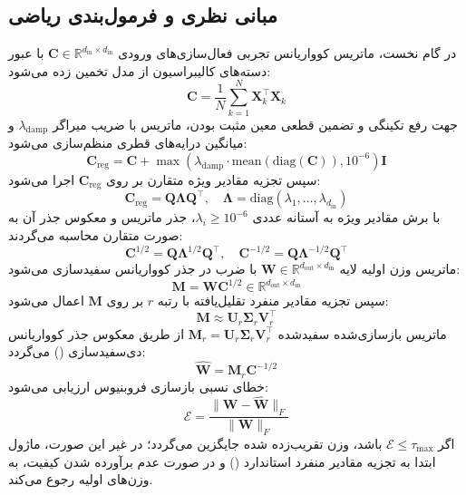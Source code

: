 \subsection{مبانی نظری و فرمول‌بندی ریاضی}
در گام نخست، ماتریس کوواریانس تجربی فعال‌سازی‌های ورودی $\mathbf{C} \in \mathbb{R}^{d_{\text{in}} \times d_{\text{in}}}$ با عبور دسته‌های کالیبراسیون از مدل تخمین زده می‌شود:
\begin{equation}
\mathbf{C} = \frac{1}{N} \sum_{k=1}^N \mathbf{X}_k^\top \mathbf{X}_k
\end{equation}
جهت رفع تکینگی و تضمین قطعی معین مثبت بودن، ماتریس با ضریب میراگر $\lambda_{\text{damp}}$ و میانگین درایه‌های قطری منظم‌سازی می‌شود:
\begin{equation}
\mathbf{C}_{\text{reg}} = \mathbf{C} + \max\left(\lambda_{\text{damp}} \cdot \text{mean}(\text{diag}(\mathbf{C})), 10^{-6}\right) \mathbf{I}
\end{equation}
سپس تجزیه مقادیر ویژه متقارن بر روی $\mathbf{C}_{\text{reg}}$ اجرا می‌شود:
\begin{equation}
\mathbf{C}_{\text{reg}} = \mathbf{Q} \mathbf{\Lambda} \mathbf{Q}^\top, \quad \mathbf{\Lambda} = \text{diag}(\lambda_1, \dots, \lambda_{d_{\text{in}}})
\end{equation}
با برش مقادیر ویژه به آستانه عددی $\lambda_i \ge 10^{-6}$، جذر ماتریس و معکوس جذر آن به صورت متقارن محاسبه می‌گردند:
\begin{equation}
\mathbf{C}^{1/2} = \mathbf{Q} \mathbf{\Lambda}^{1/2} \mathbf{Q}^\top, \quad \mathbf{C}^{-1/2} = \mathbf{Q} \mathbf{\Lambda}^{-1/2} \mathbf{Q}^\top
\end{equation}
ماتریس وزن اولیه لایه $\mathbf{W} \in \mathbb{R}^{d_{\text{out}} \times d_{\text{in}}}$ با ضرب در جذر کوواریانس سفیدسازی می‌شود:
\begin{equation}
\mathbf{M} = \mathbf{W} \mathbf{C}^{1/2} \in \mathbb{R}^{d_{\text{out}} \times d_{\text{in}}}
\end{equation}
سپس تجزیه مقادیر منفرد تقلیل‌یافته با رتبه $r$ بر روی $\mathbf{M}$ اعمال می‌شود:
\begin{equation}
\mathbf{M} \approx \mathbf{U}_r \mathbf{\Sigma}_r \mathbf{V}_r^\top
\end{equation}
ماتریس بازسازی‌شده سفیدشده $\mathbf{M}_r = \mathbf{U}_r \mathbf{\Sigma}_r \mathbf{V}_r^\top$ از طریق معکوس جذر کوواریانس دی‌سفیدسازی () می‌گردد:
\begin{equation}
\widehat{\mathbf{W}} = \mathbf{M}_r \mathbf{C}^{-1/2}
\end{equation}
خطای نسبی بازسازی فروبنیوس ارزیابی می‌شود:
\begin{equation}
\mathcal{E} = \frac{\|\mathbf{W} - \widehat{\mathbf{W}}\|_F}{\|\mathbf{W}\|_F}
\end{equation}
اگر $\mathcal{E} \le \tau_{\text{max}}$ باشد، وزن تقریب‌زده شده جایگزین می‌گردد؛ در غیر این صورت، ماژول ابتدا به تجزیه مقادیر منفرد استاندارد () و در صورت عدم برآورده شدن کیفیت، به وزن‌های اولیه رجوع می‌کند.


